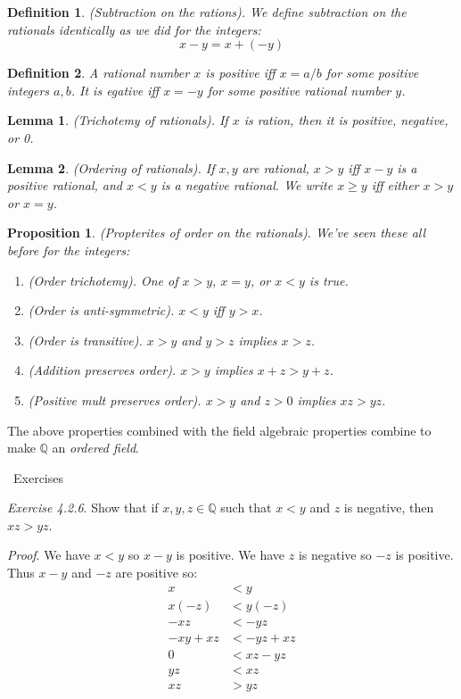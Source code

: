 \documentclass{article}
\newtheorem{definition}{Definition}[subsection]
\newtheorem{proposition}{Proposition}[subsection]
\newtheorem{lemma}{Lemma}[subsection]
\newcommand{\Q}{\mathbb{Q}}
\newcommand{\exercisesline}{	%
    \begin{center}
    \textemdash\ Exercises\ \textemdash
    \end{center}
}
\let\it\textit
\begin{document}
\begin{definition}
	(Subtraction on the rations). We define subtraction on the rationals 
	identically as we did for the integers:
	$$
	x - y = x+ (-y)
	$$
\end{definition}

\begin{definition}
	A rational number $x$ is positive iff $x = a/b$ for some 
	positive integers $a,b$. It is egative iff $x = -y$ for 
	some positive rational number $y$. 
\end{definition}

\begin{lemma}
	(Trichotemy of rationals). If $x$ is ration, then it is 
	positive, negative, or 0.
\end{lemma}

\begin{lemma}
	(Ordering of rationals). If $x,y$ are rational, $x > y$ 
	iff $x-y$ is a positive rational, and $x < y$ 
	is a negative rational. We write $x \geq y$ iff either 
	$x > y$ or $x =y$.
\end{lemma}

\begin{proposition}
	(Propterites of order on the rationals). We've seen these 
	all before for the integers:
	\begin{enumerate}[label=(\alph*)]
		\item (Order trichotemy). One of $x > y$, $x = y$, or 
			$x < y$ is true.
		\item (Order is anti-symmetric). $x < y$ iff $y > x$.
		\item (Order is transitive). $x > y$ and $y > z$ implies 
			$x > z$.
		\item (Addition preserves order). $x > y$ implies $x + z > y + z$.
		\item (Positive mult preserves order). $x > y$ and $z > 0$ implies 
			$xz > yz$.
	\end{enumerate}
\end{proposition}

The above properties combined with the field algebraic properties combine
to make $\Q$ an \it{ordered field}. 

\exercisesline

\it{Exercise 4.2.6}. Show that if $x,y,z\in\Q$ such that $x < y$ and 
$z$ is negative, then $xz > yz$.

\it{Proof}. We have $x < y$ so $x - y$ is positive. We have $z$ is
negative so $-z$ is positive. Thus $x-y$ and $-z$ are positive so:
\begin{align*}
	x &< y \\ 
	x (-z) &< y (-z) \\ 
	-xz  &< -yz \\ 
	-xy + xz &< -yz + xz \\ 
	0 &< xz - yz \\ 
	yz &< xz \\
	xz &> yz 
\end{align*}
\end{document}
